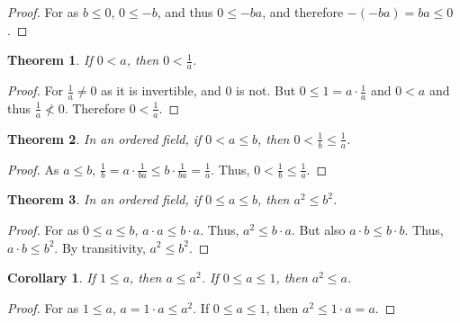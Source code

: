 \documentclass[crop=false,class=book]{standalone}
\theoremstyle{mystyle}
\newtheorem{theorem}{Theorem}[section]
\newtheorem{corollary}{Corollary}[section]
\begin{document}
\begin{proof}
For as $b\leq 0$, $0\leq -b$, and thus $0\leq -ba$, and therefore $-(-ba) = ba \leq 0$.
\end{proof}
\begin{theorem}
If $0< a$, then $0<\frac{1}{a}$.
\end{theorem}
\begin{proof}
For $\frac{1}{a}\ne 0$ as it is invertible, and $0$ is not. But $0\leq1=a\cdot \frac{1}{a}$ and $0<a$ and thus $\frac{1}{a} \not <0$. Therefore $0<\frac{1}{a}$.
\end{proof}
\begin{theorem}
In an ordered field, if $0<a\leq b$, then $0<\frac{1}{b}\leq\frac{1}{a}$.
\end{theorem}
\begin{proof}
As $a\leq b$, $\frac{1}{b}=a\cdot \frac{1}{ba} \leq b\cdot \frac{1}{ba}=\frac{1}{a}$. Thus, $0< \frac{1}{b}\leq \frac{1}{a}$.
\end{proof}
\begin{theorem}
In an ordered field, if $0 \leq a \leq b$, then $a^2 \leq b^2$.
\end{theorem}
\begin{proof}
For as $0\leq a \leq b$, $a\cdot a \leq b\cdot a$. Thus, $a^2 \leq b \cdot a$. But also $a\cdot b \leq b\cdot b$. Thus, $a\cdot b \leq b^2$. By transitivity, $a^2 \leq b^2$.
\end{proof}
\begin{corollary}
If $1\leq a$, then $a \leq a^2$. If $0\leq a \leq 1$, then $a^2 \leq a$.
\end{corollary}
\begin{proof}
For as $1\leq a$, $a=1\cdot a \leq a^2$. If $0\leq a \leq 1$, then $a^2 \leq 1\cdot a = a$.
\end{proof}
\end{document}
